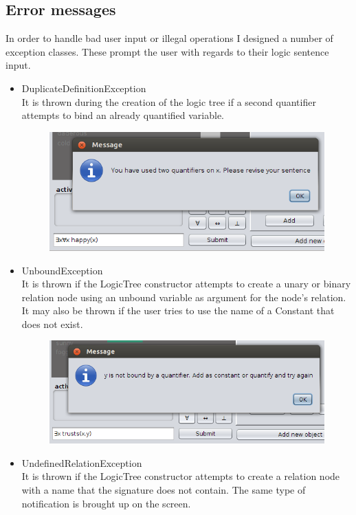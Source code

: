 \documentclass{report}
\begin{document}
\subsection{Error messages}
In order to handle bad user input or illegal operations I designed a number of 
exception classes. These prompt the user with regards to their logic sentence 
input.
\begin{itemize}
\item DuplicateDefinitionException\\
It is thrown during the creation of the logic tree if a second quantifier 
attempts to bind an already quantified variable.
\begin{figure}[h!]
\centering \includegraphics[scale=0.6]{duplicate.png}
\end{figure}
\item UnboundException\\
It is thrown if the LogicTree constructor attempts to create a unary or binary 
relation node using an unbound variable as argument for the node's relation. It 
may also be thrown if the user tries to use the name of a Constant that does not 
exist.
\begin{figure}[h!]
\centering \includegraphics[scale=0.6]{unbound.png}
\end{figure}

\item UndefinedRelationException\\
It is thrown if the LogicTree constructor attempts to create a relation node 
with a name that the signature does not contain. The same type of notification
is brought up on the screen.
\end{itemize}
\end{document}
